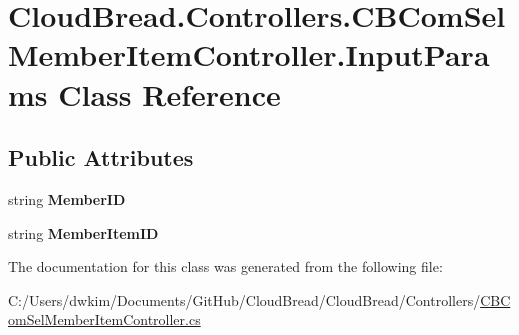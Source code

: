 \hypertarget{class_cloud_bread_1_1_controllers_1_1_c_b_com_sel_member_item_controller_1_1_input_params}{}\section{Cloud\+Bread.\+Controllers.\+C\+B\+Com\+Sel\+Member\+Item\+Controller.\+Input\+Params Class Reference}
\label{class_cloud_bread_1_1_controllers_1_1_c_b_com_sel_member_item_controller_1_1_input_params}
\subsection*{Public Attributes}
\begin{DoxyCompactItemize}
\item 
string {\bfseries Member\+ID}\hypertarget{class_cloud_bread_1_1_controllers_1_1_c_b_com_sel_member_item_controller_1_1_input_params_a49461f3a84e674cf50d09ec56c3d4d68}{}\label{class_cloud_bread_1_1_controllers_1_1_c_b_com_sel_member_item_controller_1_1_input_params_a49461f3a84e674cf50d09ec56c3d4d68}

\item 
string {\bfseries Member\+Item\+ID}\hypertarget{class_cloud_bread_1_1_controllers_1_1_c_b_com_sel_member_item_controller_1_1_input_params_a95001064eb84f90b33510cdaf2ca068a}{}\label{class_cloud_bread_1_1_controllers_1_1_c_b_com_sel_member_item_controller_1_1_input_params_a95001064eb84f90b33510cdaf2ca068a}

\end{DoxyCompactItemize}


The documentation for this class was generated from the following file\+:\begin{DoxyCompactItemize}
\item 
C\+:/\+Users/dwkim/\+Documents/\+Git\+Hub/\+Cloud\+Bread/\+Cloud\+Bread/\+Controllers/\hyperlink{_c_b_com_sel_member_item_controller_8cs}{C\+B\+Com\+Sel\+Member\+Item\+Controller.\+cs}\end{DoxyCompactItemize}
